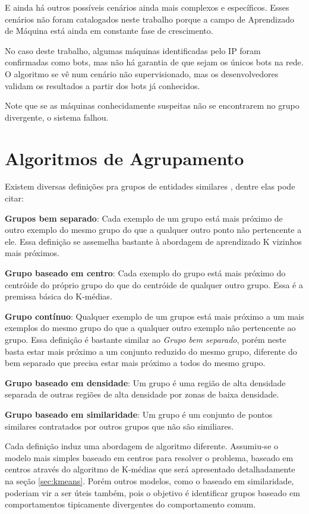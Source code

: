 E ainda há outros possíveis cenários ainda mais complexos e específicos. Esses cenários não foram catalogados neste trabalho porque a campo de Aprendizado de Máquina está ainda em constante fase de crescimento.

No caso deste trabalho, algumas máquinas identificadas pelo IP foram confirmadas como bots, mas não há garantia de que sejam os únicos bots na rede. O algoritmo se vê num cenário não supervisionado, mas os desenvolvedores validam os resultados a partir dos bots já conhecidos.

Note que se as máquinas conhecidamente suspeitas não se encontrarem no grupo divergente, o sistema falhou.

\section{Algoritmos de Agrupamento}

Existem diversas definições pra grupos de entidades similares \citep{faceli2011inteligencia}, dentre elas pode citar:
\begin{description}
\item \textbf{Grupos bem separado}: Cada exemplo de um grupo está mais próximo de outro exemplo do mesmo grupo do que a qualquer outro ponto não pertencente a ele. Essa definição se assemelha bastante à abordagem de aprendizado K vizinhos mais próximos.
\item \textbf{Grupo baseado em centro}: Cada exemplo do grupo está mais próximo do centróide do próprio grupo do que do centróide de qualquer outro grupo. Essa é a premissa básica do K-médias.
\item \textbf{Grupo contínuo}: Qualquer exemplo de um grupos está mais próximo a um mais exemplos do mesmo grupo do que a qualquer outro exemplo não pertencente ao grupo. Essa definição é bastante similar ao \textit{Grupo bem separado}, porém neste basta estar mais próximo a um conjunto reduzido do mesmo grupo, diferente do bem separado que precisa estar mais próximo a todos do mesmo grupo.
\item \textbf{Grupo baseado em densidade}: Um grupo é uma região de alta densidade separada de outras regiões de alta densidade por zonas de baixa densidade.
\item \textbf{Grupo baseado em similaridade}: Um grupo é um conjunto de pontos similares contratados por outros grupos que não são similiares.
\end{description}

Cada definição induz uma abordagem de algoritmo diferente. Assumiu-se o modelo mais simples baseado em centros para resolver o problema, baseado em centros através do algoritmo de K-médias que será apresentado detalhadamente na seção \ref{sec:kmeans}. Porém outros modelos, como o baseado em similaridade, poderiam vir a ser úteis também, pois o objetivo é identificar grupos baseado em comportamentos tipicamente divergentes do comportamento comum.

